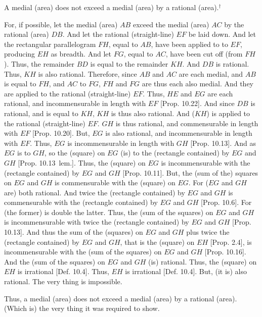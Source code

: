 \begin{Parallel}{}{}
{A medial (area) does not exceed a medial
(area) by a rational (area).$^\dag$

\epsfysize=1.8in
\centerline{}

For, if possible, let the medial (area) $AB$ exceed the medial (area) $AC$
by the rational (area) $DB$. And let the rational (straight-line)
$EF$ be laid down. And let the rectangular parallelogram $FH$, equal to $AB$, have been
applied to to $EF$, producing $EH$ as breadth. And let $FG$, equal to
$AC$, have been cut off (from $FH$). Thus, the remainder $BD$
is equal to the remainder $KH$. And $DB$ is rational. Thus, $KH$
is also rational. Therefore, since $AB$ and $AC$ are each medial, and
$AB$ is equal to $FH$, and $AC$ to $FG$, $FH$ and $FG$ are thus each also medial. And they are applied to the rational (straight-line)
$EF$. Thus, $HE$ and $EG$ are each rational, and incommensurable
in length with $EF$ [Prop. 10.22]. 
And since $DB$ is rational, and is equal to $KH$, $KH$ is thus  also
rational. And ($KH$) is  applied to the rational (straight-line)
$EF$. $GH$ is thus rational, and commensurable in length with
$EF$ [Prop. 10.20]. But, $EG$ is also
rational, and incommensurable in length with $EF$. Thus, $EG$ is
incommensurable in length with $GH$ [Prop. 10.13]. And as $EG$ is to $GH$, so the
(square) on $EG$ (is) to the (rectangle contained) by $EG$ and
$GH$ [Prop. 10.13~lem.]. Thus, the (square)
on $EG$ is incommensurable with the (rectangle contained) by 
$EG$ and $GH$ [Prop. 10.11]. 
But, the (sum of the) squares on $EG$ and $GH$ is commensurable with
the (square) on $EG$. For ($EG$ and $GH$ are) both rational.
And twice the (rectangle contained) by $EG$ and $GH$ is commensurable
with the (rectangle contained) by $EG$ and $GH$ [Prop. 10.6]. For (the former) is double the latter.
Thus, the (sum of the squares) on $EG$ and $GH$ is incommensurable
with twice the (rectangle contained) by $EG$ and $GH$
[Prop. 10.13]. 
And thus the sum of the (squares) on $EG$ and $GH$ plus twice the (rectangle contained) by
$EG$ and $GH$, that is the (square) on $EH$ [Prop. 2.4], is incommensurable with the (sum
of the squares) on $EG$ and $GH$ [Prop. 10.16].
And the (sum of the squares) on $EG$ and $GH$ (is) rational. 
Thus, the (square) on $EH$ is irrational [Def. 10.4].
Thus, $EH$ is irrational  [Def. 10.4]. But,
(it is) also rational. The very thing is impossible.

Thus, a medial (area) does not exceed a medial
(area) by a rational (area). (Which is) the very thing it was required to show.}
\end{Parallel}


